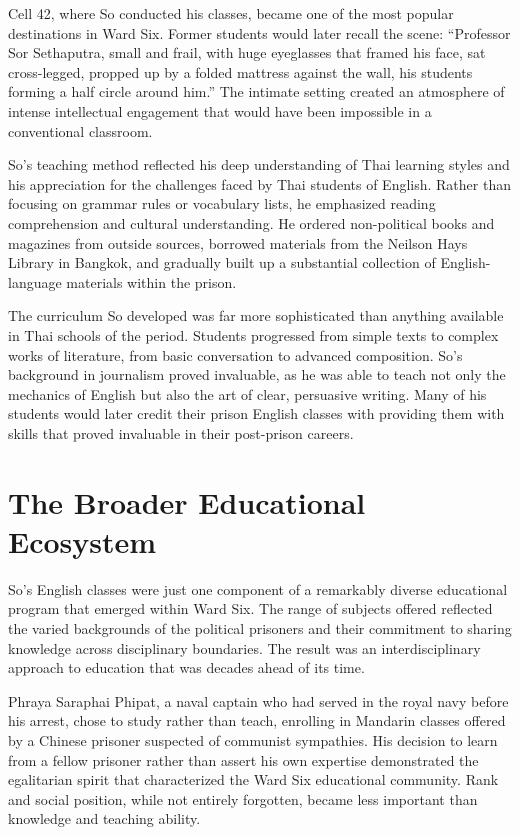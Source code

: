 \documentclass[
  Letterpaper,
]{scrbook}
\begin{document}
Cell 42, where So conducted his classes, became one of the most popular
destinations in Ward Six. Former students would later recall the scene:
``Professor Sor Sethaputra, small and frail, with huge eyeglasses that
framed his face, sat cross-legged, propped up by a folded mattress
against the wall, his students forming a half circle around him.'' The
intimate setting created an atmosphere of intense intellectual
engagement that would have been impossible in a conventional classroom.

So's teaching method reflected his deep understanding of Thai learning
styles and his appreciation for the challenges faced by Thai students of
English. Rather than focusing on grammar rules or vocabulary lists, he
emphasized reading comprehension and cultural understanding. He ordered
non-political books and magazines from outside sources, borrowed
materials from the Neilson Hays Library in Bangkok, and gradually built
up a substantial collection of English-language materials within the
prison.

The curriculum So developed was far more sophisticated than anything
available in Thai schools of the period. Students progressed from simple
texts to complex works of literature, from basic conversation to
advanced composition. So's background in journalism proved invaluable,
as he was able to teach not only the mechanics of English but also the
art of clear, persuasive writing. Many of his students would later
credit their prison English classes with providing them with skills that
proved invaluable in their post-prison careers.

\section{The Broader Educational
Ecosystem}\label{the-broader-educational-ecosystem}

So's English classes were just one component of a remarkably diverse
educational program that emerged within Ward Six. The range of subjects
offered reflected the varied backgrounds of the political prisoners and
their commitment to sharing knowledge across disciplinary boundaries.
The result was an interdisciplinary approach to education that was
decades ahead of its time.

Phraya Saraphai Phipat, a naval captain who had served in the royal navy
before his arrest, chose to study rather than teach, enrolling in
Mandarin classes offered by a Chinese prisoner suspected of communist
sympathies. His decision to learn from a fellow prisoner rather than
assert his own expertise demonstrated the egalitarian spirit that
characterized the Ward Six educational community. Rank and social
position, while not entirely forgotten, became less important than
knowledge and teaching ability.
\end{document}
